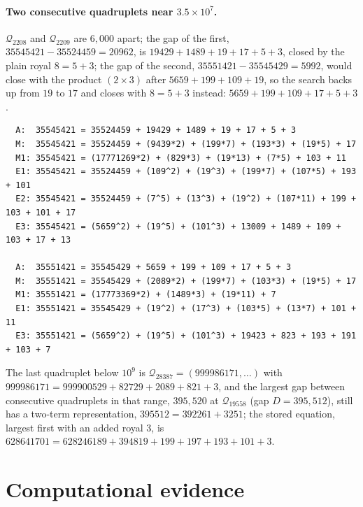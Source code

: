 \documentclass[11pt,a4paper]{article}
\newcommand{\Q}{\mathcal{Q}}
\begin{document}
\paragraph{Two consecutive quadruplets near $3.5\times10^7$.}
$\Q_{2208}$ and $\Q_{2209}$ are $6{,}000$ apart; the gap of the first,
$35545421-35524459=20962$, is $19429+1489+19+17+5+3$, closed by the plain
royal $8=5+3$; the gap of the second, $35551421-35545429=5992$, would
close with the product $(2\times3)$ after $5659+199+109+19$, so the search
backs up from $19$ to $17$ and closes with $8=5+3$ instead:
$5659+199+109+17+5+3$.
\begin{small}\begin{verbatim}
  A:  35545421 = 35524459 + 19429 + 1489 + 19 + 17 + 5 + 3
  M:  35545421 = 35524459 + (9439*2) + (199*7) + (193*3) + (19*5) + 17
  M1: 35545421 = (17771269*2) + (829*3) + (19*13) + (7*5) + 103 + 11
  E1: 35545421 = 35524459 + (109^2) + (19^3) + (199*7) + (107*5) + 193 + 101
  E2: 35545421 = 35524459 + (7^5) + (13^3) + (19^2) + (107*11) + 199 + 103 + 101 + 17
  E3: 35545421 = (5659^2) + (19^5) + (101^3) + 13009 + 1489 + 109 + 103 + 17 + 13

  A:  35551421 = 35545429 + 5659 + 199 + 109 + 17 + 5 + 3
  M:  35551421 = 35545429 + (2089*2) + (199*7) + (103*3) + (19*5) + 17
  M1: 35551421 = (17773369*2) + (1489*3) + (19*11) + 7
  E1: 35551421 = 35545429 + (19^2) + (17^3) + (103*5) + (13*7) + 101 + 11
  E3: 35551421 = (5659^2) + (19^5) + (101^3) + 19423 + 823 + 193 + 191 + 103 + 7
\end{verbatim}\end{small}

The last quadruplet below $10^9$ is $\Q_{28387}=(999986171,\dots)$ with
$999986171 = 999900529 + 82729 + 2089 + 821 + 3$, and the largest gap
between consecutive quadruplets in that range, $395{,}520$ at
$\Q_{19558}$ (gap $D=395{,}512$), still has a two-term representation,
$395512=392261+3251$; the stored equation, largest first with an added
royal $3$, is
$628641701 = 628246189 + 394819 + 199 + 197 + 193 + 101 + 3$.

\section{Computational evidence}
\label{sec:evidence}
\end{document}
